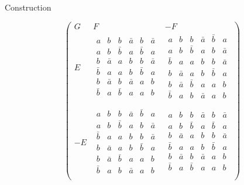 \documentclass{beamer}
\begin{document}
\begin{frame}{Construction}

  \[
    \left(
      \begin{array}{c|c|c}
        G & F & -F \\ \hline
        E
          &
            \begin{array}{cccccc}
              a&b&b&\bar{a}&b&\bar{a}\\
              a&b&\bar{b}&a&\bar{b}&a\\
              b&\bar{a}&a&b&b&\bar{a}\\
              \bar{b}&a&a&b&\bar{b}&a\\
              b&\bar{a}&b&\bar{a}&a&b\\
              \bar{b}&a&\bar{b}&a&a&b\\
            \end{array}
          &
          \begin{array}{cccccc}
            a&b&b&\bar{a}&\bar{b}&a\\
            a&b&\bar{b}&a&b&\bar{a}\\
            \bar{b}&a&a&b&b&\bar{a}\\
            b&\bar{a}&a&b&\bar{b}&a\\
            b&\bar{a}&\bar{b}&a&a&b\\
            \bar{b}&a&b&\bar{a}&a&b\\
          \end{array} 
        \\ \hline
        -E
          &
            \begin{array}{cccccc}
              a&b&b&\bar{a}&\bar{b}&a\\
              a&b&\bar{b}&a&b&\bar{a}\\
              \bar{b}&a&a&b&b&\bar{a}\\
              b&\bar{a}&a&b&\bar{b}&a\\
              b&\bar{a}&\bar{b}&a&a&b\\
              \bar{b}&a&b&\bar{a}&a&b\\
            \end{array}
          &
            \begin{array}{cccccc}
              a&b&b&\bar{a}&b&\bar{a}\\
              a&b&\bar{b}&a&\bar{b}&a\\
              b&\bar{a}&a&b&b&\bar{a}\\
              \bar{b}&a&a&b&\bar{b}&a\\
              b&\bar{a}&b&\bar{a}&a&b\\
              \bar{b}&a&\bar{b}&a&a&b\\
            \end{array}
      \end{array}
    \right)
  \]
  
\end{frame}
\end{document}
